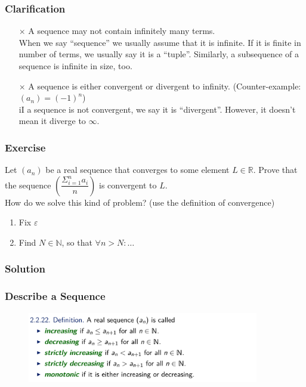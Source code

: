 \documentclass[10pt, t]{beamer}
\newcommand{\N}{\mathbb{N}}
\newcommand{\R}{\mathbb{R}}
\newcommand{\nullspace}{~\\[15pt]}
\begin{document}
\begin{frame}
    \frametitle{Clarification}

    \begin{itemize}
        \item[$\times$] A sequence may not contain infinitely many terms.\\
              When we say “sequence” we usually assume that it is infinite. If it is
              finite in number of terms, we usually say it is a ``tuple''. Similarly, a subsequence of a sequence is infinite in size, too.
        \item[$\times$] A sequence is either convergent or divergent to infinity. (Counter-example: $(a_n)=(-1)^n$)\\
              iI a sequence is not convergent, we say it is “divergent”.
              However, it doesn’t mean it diverge to $\infty$.
    \end{itemize}
\end{frame}

\begin{frame}
    \frametitle{Exercise}
    Let $(a_n)$ be a real sequence that converges to some element $L\in\R$. Prove that the sequence $\left( \dfrac{\Sigma_{i=1}^na_i}{n}\right)$ is convergent to $L$.
    \pause
    \nullspace How do we solve this kind of problem? (use the definition of convergence)
    \begin{enumerate}
        \item Fix $\varepsilon$
        \item Find $N\in\N$, so that $\forall n>N:\dots$
    \end{enumerate}

\end{frame}

\begin{frame}
    \frametitle{Solution}

    

\end{frame}

\begin{frame}
    \frametitle{Describe a Sequence}

    \begin{figure}[H]
        \centering
        \includegraphics[width=0.9\textwidth]{2020-09-30-14-42-44.png}
    \end{figure}

\end{frame}
\end{document}
